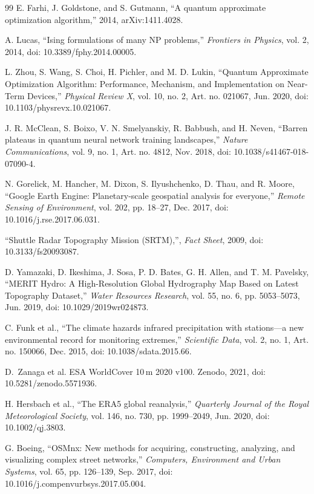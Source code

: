 \documentclass[10pt,twocolumn]{article}
\begin{document}
{\begin{thebibliography}{99}
E. Farhi, J. Goldstone, and S. Gutmann, ``A quantum approximate optimization algorithm,'' 2014, arXiv:1411.4028.

A. Lucas, ``Ising formulations of many NP problems,'' \emph{Frontiers in Physics}, vol. 2, 2014, doi: 10.3389/fphy.2014.00005.

L. Zhou, S. Wang, S. Choi, H. Pichler, and M. D. Lukin, ``Quantum Approximate Optimization Algorithm: Performance, Mechanism, and Implementation on Near-Term Devices,'' \emph{Physical Review X}, vol. 10, no. 2, Art. no. 021067, Jun. 2020, doi: 10.1103/physrevx.10.021067.

J. R. McClean, S. Boixo, V. N. Smelyanskiy, R. Babbush, and H. Neven, ``Barren plateaus in quantum neural network training landscapes,'' \emph{Nature Communications}, vol. 9, no. 1, Art. no. 4812, Nov. 2018, doi: 10.1038/s41467-018-07090-4.

N. Gorelick, M. Hancher, M. Dixon, S. Ilyushchenko, D. Thau, and R. Moore, ``Google Earth Engine: Planetary-scale geospatial analysis for everyone,'' \emph{Remote Sensing of Environment}, vol. 202, pp. 18--27, Dec. 2017, doi: 10.1016/j.rse.2017.06.031.

``Shuttle Radar Topography Mission (SRTM),'', \emph{Fact Sheet}, 2009, doi: 10.3133/fs20093087.

D. Yamazaki, D. Ikeshima, J. Sosa, P. D. Bates, G. H. Allen, and T. M. Pavelsky, ``MERIT Hydro: A High-Resolution Global Hydrography Map Based on Latest Topography Dataset,'' \emph{Water Resources Research}, vol. 55, no. 6, pp. 5053--5073, Jun. 2019, doi: 10.1029/2019wr024873.

C. Funk et al., ``The climate hazards infrared precipitation with stations---a new environmental record for monitoring extremes,'' \emph{Scientific Data}, vol. 2, no. 1, Art. no. 150066, Dec. 2015, doi: 10.1038/sdata.2015.66.

D.~Zanaga et al. ESA WorldCover 10\,m 2020 v100. Zenodo, 2021, doi: 10.5281/zenodo.5571936.

H. Hersbach et al., ``The ERA5 global reanalysis,'' \emph{Quarterly Journal of the Royal Meteorological Society}, vol. 146, no. 730, pp. 1999--2049, Jun. 2020, doi: 10.1002/qj.3803.

G. Boeing, ``OSMnx: New methods for acquiring, constructing, analyzing, and visualizing complex street networks,'' \emph{Computers, Environment and Urban Systems}, vol. 65, pp. 126--139, Sep. 2017, doi: 10.1016/j.compenvurbsys.2017.05.004.


\end{thebibliography}}
\end{document}
